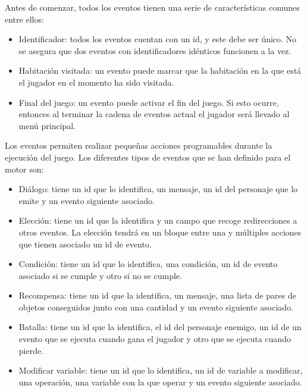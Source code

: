Antes de comenzar, todos los eventos tienen una serie de características comunes entre ellos:
\begin{itemize}
	\item Identificador: todos los eventos cuentan con un id, y este debe ser único. No se asegura que dos eventos con identificadores idénticos funcionen a la vez.
	\item Habitación visitada: un evento puede marcar que la habitación en la que está el jugador en el momento ha sido visitada.
	\item Final del juego: un evento puede activar el fin del juego. Si esto ocurre, entonces al terminar la cadena de eventos actual el jugador será llevado al menú principal.
\end{itemize}

Los eventos permiten realizar pequeñas acciones programables durante la ejecución del juego. Los diferentes tipos de eventos que se han definido para el motor son:
\begin{itemize}
	\item Diálogo: tiene un id que lo identifica, un mensaje, un id del personaje que lo emite y un evento siguiente asociado.
	\item Elección: tiene un id que la identifica y un campo que recoge redirecciones a otros eventos. La elección tendrá en un bloque entre una y múltiples acciones que tienen asociado un id de evento.
	\item Condición: tiene un id que lo identifica, una condición, un id de evento asociado si se cumple y otro si no se cumple.
	\item Recompensa: tiene un id que la identifica, un mensaje, una lista de pares de objetos conseguidos junto con una cantidad y un evento siguiente asociado.
	\item Batalla: tiene un id que la identifica, el id del personaje enemigo, un id de un evento que se ejecuta cuando gana el jugador y otro que se ejecuta cuando pierde.
	\item Modificar variable: tiene un id que lo identifica, un id de variable a modificar, una operación, una variable con la que operar y un evento siguiente asociado.
\end{itemize}


